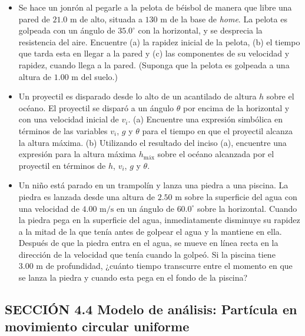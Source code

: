 \documentclass[11pt,a4paper]{article}
\begin{document}
\begin{itemize}
    \item[\textbf{15.}] Se hace un jonrón al pegarle a la pelota de béisbol de manera que libre una pared de $21.0 \text{ m}$ de alto, situada a $130 \text{ m}$ de la base de \textit{home}. La pelota es golpeada con un ángulo de $35.0^\circ$ con la horizontal, y se desprecia la resistencia del aire. Encuentre (a) la rapidez inicial de la pelota, (b) el tiempo que tarda esta en llegar a la pared y (c) las componentes de su velocidad y rapidez, cuando llega a la pared. (Suponga que la pelota es golpeada a una altura de $1.00 \text{ m}$ del suelo.)
    \vspace*{6cm}

    \item[\textbf{16.}] Un proyectil es disparado desde lo alto de un acantilado de altura $h$ sobre el océano. El proyectil se disparó a un ángulo $\theta$ por encima de la horizontal y con una velocidad inicial de $v_i$. (a) Encuentre una expresión simbólica en términos de las variables $v_i$, $g$ y $\theta$ para el tiempo en que el proyectil alcanza la altura máxima. (b) Utilizando el resultado del inciso (a), encuentre una expresión para la altura máxima $h_{\text{máx}}$ sobre el océano alcanzada por el proyectil en términos de $h$, $v_i$, $g$ y $\theta$.
    \vspace*{6cm}

    \item[\textbf{17.}] Un niño está parado en un trampolín y lanza una piedra a una piscina. La piedra es lanzada desde una altura de $2.50 \text{ m}$ sobre la superficie del agua con una velocidad de $4.00 \text{ m/s}$ en un ángulo de $60.0^\circ$ sobre la horizontal. Cuando la piedra pega en la superficie del agua, inmediatamente disminuye su rapidez a la mitad de la que tenía antes de golpear el agua y la mantiene en ella. Después de que la piedra entra en el agua, se mueve en línea recta en la dirección de la velocidad que tenía cuando la golpeó. Si la piscina tiene $3.00 \text{ m}$ de profundidad, ¿cuánto tiempo transcurre entre el momento en que se lanza la piedra y cuando esta pega en el fondo de la piscina?
    \vspace*{7cm}
\end{itemize}

\newpage

\subsection*{SECCIÓN 4.4 Modelo de análisis: Partícula en movimiento circular uniforme}
\end{document}
